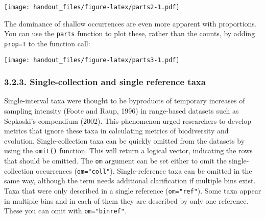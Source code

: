 \documentclass[]{article}
\newenvironment{Shaded}{\begin{snugshade}}{\end{snugshade}}
\newcommand{\DataTypeTok}[1]{\textcolor[rgb]{0.13,0.29,0.53}{#1}}
\newcommand{\DecValTok}[1]{\textcolor[rgb]{0.00,0.00,0.81}{#1}}
\newcommand{\FloatTok}[1]{\textcolor[rgb]{0.00,0.00,0.81}{#1}}
\newcommand{\KeywordTok}[1]{\textcolor[rgb]{0.13,0.29,0.53}{\textbf{#1}}}
\newcommand{\NormalTok}[1]{#1}
\newcommand{\OperatorTok}[1]{\textcolor[rgb]{0.81,0.36,0.00}{\textbf{#1}}}
\newcommand{\StringTok}[1]{\textcolor[rgb]{0.31,0.60,0.02}{#1}}
\begin{document}
\texttt{[image: handout\_files/figure-latex/parts2-1.pdf]}

The dominance of shallow occurrences are even more apparent with
proportions. You can use the \texttt{parts} function to plot these,
rather than the counts, by adding \texttt{prop=T} to the function call:

\begin{Shaded}
\end{Shaded}

\texttt{[image: handout\_files/figure-latex/parts3-1.pdf]}

\hypertarget{single-collection-and-single-reference-taxa}{%
\subsubsection{3.2.3. Single-collection and single reference
taxa}\label{single-collection-and-single-reference-taxa}}

Single-interval taxa were thought to be byproducts of temporary
increases of sampling intensity (Foote and Raup, 1996) in range-based
datasets such as Sepkoski's compendium (2002). This phenomenon urged
researchers to develop metrics that ignore these taxa in calculating
metrics of biodiversity and evolution. Single-collection taxa can be
quickly omitted from the datasets by using the \texttt{omit()} function.
This will return a logical vector, indicating the rows that should be
omitted. The \texttt{om} argument can be set either to omit the
single-collection occurrences (\texttt{om="coll"}). Single-reference
taxa can be omitted in the same way, although the term needs additional
clarification if multiple bins exist. Taxa that were only described in a
single reference (\texttt{om="ref"}). Some taxa appear in multiple bins
and in each of them they are described by only one reference. These you
can omit with \texttt{om="binref"}.
\end{document}
